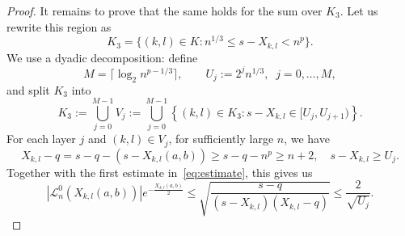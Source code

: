 \documentclass[11pt]{amsart}
\numberwithin{equation}{section}
\begin{document}
\begin{proof}
    It remains to prove that the same holds for the sum over $K_3$. Let us rewrite this region as
    \begin{equation}
        K_3 = \{(k,l)\in K: n^{1/3} \leq s - X_{k,l} < n^{p}\}.
    \end{equation}
    We use a dyadic decomposition: define
    \begin{equation}
        M=\lceil \log_2 n^{p-1/3}\rceil , \qquad U_j:=2^j n^{1/3}, \,\,\ j=0,\dots,M,
    \end{equation}
    and split $K_3$ into 
    \begin{equation}
        K_3:=\bigcup\limits_{j=0}^{M-1} V_j := \bigcup\limits_{j=0}^{M-1} \left\{ (k,l) \in K_3: s-X_{k,l} \in [U_j, U_{j+1})  \right\}.
    \end{equation}
    For each layer $j$ and $(k,l)\in V_j$, for sufficiently large $n$, we have
    \begin{equation}
        X_{k,l}-q = s-q-(s-X_{k,l}(a,b)) \geq s-q-n^p \geq n+2, \quad s-X_{k,l}\geq U_j.
    \end{equation}
    Together with the first estimate in~\eqref{eq:estimate}, this gives us
    \begin{equation}\label{eq:Laguerre_on_dyadic_layer}
        |\mathcal{L}_n^{0}(X_{k,l}(a,b))|e^{-\frac{X_{k,l}(a,b)}{2}} \leq  \sqrt{\frac{s-q}{(s-X_{k,l})(X_{k,l}-q)}} \leq \frac{2}{\sqrt{U_j}}.
    \end{equation}


\end{proof}
\end{document}
